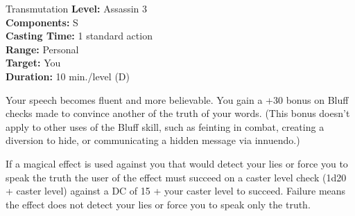 {Transmutation}
{
	\textbf{Level:}
	Assassin 3\\
	\textbf{Components:}
	S\\
	\textbf{Casting Time:}
	1 standard action\\
	\textbf{Range:}
	Personal\\
	\textbf{Target:}
	You\\
	\textbf{Duration:}
	10 min./level (D)\\
}
{
	Your speech becomes fluent and more believable. You gain a +30 bonus on Bluff checks made to convince another of the truth of your words. (This bonus doesn't apply to other uses of the Bluff skill, such as feinting in combat, creating a diversion to hide, or communicating a hidden message via innuendo.)

	If a magical effect is used against you that would detect your lies or force you to speak the truth the user of the effect must succeed on a caster level check (1d20 + caster level) against a DC of 15 + your caster level to succeed. Failure means the effect does not detect your lies or force you to speak only the truth.

}
